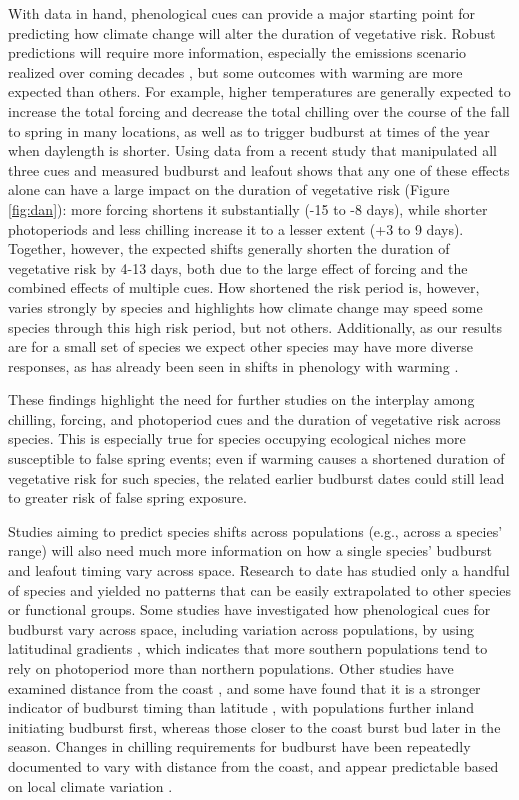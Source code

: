 \documentclass{article}\usepackage[]{graphicx}\usepackage[]{color}
\begin{document}
With data in hand, phenological cues can provide a major starting point for predicting how climate change will alter the duration of vegetative risk. Robust predictions will require more information, especially the emissions scenario realized over coming decades \citep{IPCC2014}, but some outcomes with warming are more expected than others. For example, higher temperatures are generally expected to increase the total forcing and decrease the total chilling over the course of the fall to spring in many locations, as well as to trigger budburst at times of the year when daylength is shorter. Using data from a recent study that manipulated all three cues and measured budburst and leafout \citep{Flynn2018} shows that any one of these effects alone can have a large impact on the duration of vegetative risk (Figure \ref{fig:dan}): more forcing shortens it substantially (-15 to -8 days), while shorter photoperiods and less chilling increase it to a lesser extent (+3 to 9 days). Together, however, the expected shifts generally shorten the duration of vegetative risk by 4-13 days, both due to the large effect of forcing and the combined effects of multiple cues. How shortened the risk period is, however, varies strongly by species and highlights how climate change may speed some species through this high risk period, but not others. Additionally, as our results are for a small set of species we expect other species may have more diverse responses, as has already been seen in shifts in phenology with warming \citep{Cleland2006, Fu2015, Xin2016}.

These findings highlight the need for further studies on the interplay among chilling, forcing, and photoperiod cues and the duration of vegetative risk across species. This is especially true for species occupying ecological niches more susceptible to false spring events; even if warming causes a shortened duration of vegetative risk for such species, the related earlier budburst dates could still lead to greater risk of false spring exposure.

Studies aiming to predict species shifts across populations (e.g., across a species' range) will also need much more information on how a single species' budburst and leafout timing vary across space. Research to date has studied only a handful of species and yielded no patterns that can be easily extrapolated to other species or functional groups. Some studies have investigated how phenological cues for budburst vary across space, including variation across populations, by using latitudinal gradients \citep{Gauzere2017, Sogaard2008, Way2015, Zohner2016}, which indicates that more southern populations tend to rely on photoperiod more than northern populations. Other studies have examined distance from the coast \citep[see][]{Aitken2015, Harrington2015, Myking2007}, and some have found that it is a stronger indicator of budburst timing than latitude \citep{Myking2007}, with populations further inland initiating budburst first, whereas those closer to the coast burst bud later in the season. Changes in chilling requirements for budburst have been repeatedly documented to vary with distance from the coast, and appear predictable based on local climate variation \citep{Campbell1979, Howe2003}.  
\end{document}
